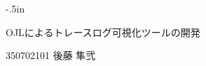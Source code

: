\documentclass[a4paper,12pt]{jreport}
\begin{document}









\clearpage
\mbox{}\newpage
\thispagestyle{empty}
\oddsidemargin -4in
\evensidemargin -4in
\topmargin -.5in
{
\tate
\Large\sffamily\gtfamily
\begin{minipage}{9.5in}
\begin{minipage}{6.0in}
OJLによるトレースログ可視化ツールの開発
\end{minipage}
\hfill\hfill\hfill\hfill
350702101
\hfill
後藤 隼弐
\end{minipage}
}
\end{document}
